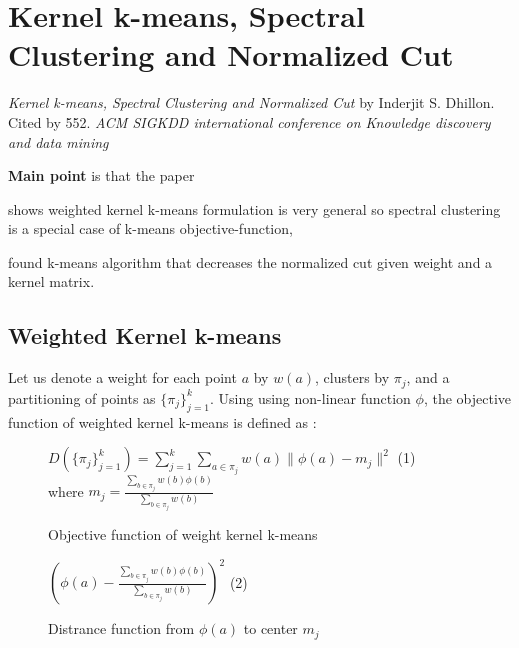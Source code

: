 \section{Kernel k-means, Spectral Clustering and Normalized Cut}
\label{ch:dhillon04}

\textit{Kernel k-means, Spectral Clustering and Normalized Cut} by Inderjit S. Dhillon.
Cited by 552. \textit{ACM SIGKDD international conference on Knowledge discovery and data mining}
\newline

\textbf{Main point} is that the paper \begin{inparaenum}
\item shows weighted kernel k-means formulation is very general so spectral clustering is a special case of k-means objective-function, 
\item found k-means algorithm that decreases the normalized cut given weight and a kernel matrix.
\end{inparaenum}

\subsection{Weighted Kernel k-means}
Let us denote a weight for each point $a$ by $w(a)$, clusters by $\pi_j$, and a partitioning of points as $\{\pi_j\}_{j=1}^k$. Using using non-linear function $\phi$, the objective function of weighted kernel k-means is defined as :

\begin{figure}[ht]
\begin{mdframed}
$ D(\{ \pi_j \}_{j=1}^k) = \sum\limits_{j=1}^k \sum\limits_{a \in \pi_j} w(a)\| \phi(a) - m_j \|^2 $ (1) \\
where $m_j = \frac{\sum_{b \in \pi_j} w(b) \phi(b)}{ \sum_{b \in \pi_j } w(b) } $
\end{mdframed}
\caption{Objective function of weight kernel k-means}
\end{figure}

\begin{figure}[ht]
\begin{mdframed}
$ (\phi(a) - \frac{\sum_{b \in \pi_j} w(b)\phi(b)}{\sum_{b \in \pi_j} w(b) })^2$  (2)
\end{mdframed}
\caption{Distrance function from $\phi(a)$ to center $m_j$}
\end{figure}

